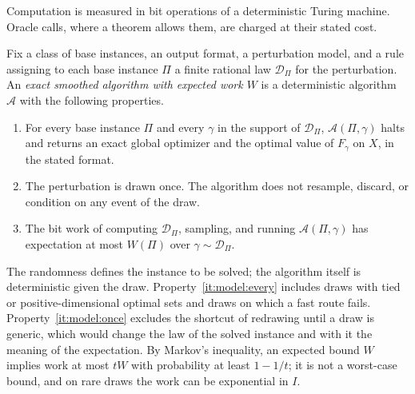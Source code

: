 Computation is measured in bit operations of a deterministic Turing
machine. Oracle calls, where a theorem allows them, are charged at their
stated cost.

\begin{definition}\label{def:model:algorithm}
Fix a class of base instances, an output format, a perturbation model, and a
rule assigning to each base instance $\Pi$ a finite rational law
$\mathcal D_\Pi$ for the perturbation. An \emph{exact smoothed algorithm with
expected work $W$} is a deterministic algorithm $\mathcal A$ with the
following properties.
\begin{enumerate}[label=(\roman*)]
\item\label{it:model:every} For every base instance $\Pi$ and every $\gamma$
in the support of $\mathcal D_\Pi$, $\mathcal A(\Pi,\gamma)$ halts and
returns an exact global optimizer and the optimal value of $F_\gamma$ on $X$,
in the stated format.
\item\label{it:model:once} The perturbation is drawn once. The algorithm
does not resample, discard, or condition on any event of the draw.
\item\label{it:model:expect} The bit work of computing $\mathcal D_\Pi$,
sampling, and running $\mathcal A(\Pi,\gamma)$ has expectation at most
$W(\Pi)$ over $\gamma\sim\mathcal D_\Pi$.
\end{enumerate}
\end{definition}

The randomness defines the instance to be solved; the algorithm itself is
deterministic given the draw. Property~\ref{it:model:every} includes draws
with tied or positive-dimensional optimal sets and draws on which a fast
route fails. Property~\ref{it:model:once} excludes the shortcut of redrawing
until a draw is generic, which would change the law of the solved instance
and with it the meaning of the expectation. By Markov's inequality, an
expected bound $W$ implies work at most $tW$ with probability at least
$1-1/t$; it is not a worst-case bound, and on rare draws the work can be
exponential in $I$.

